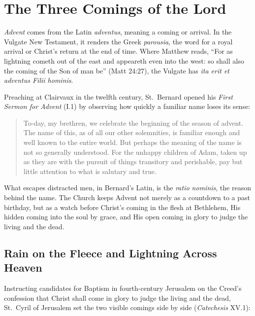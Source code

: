 \section{The Three Comings of the Lord}\label{sec:three-comings}

\textit{Advent} comes from the Latin \textit{adventus}, meaning a coming or
arrival. In the Vulgate New Testament, it renders the Greek
\textit{parousia}, the word for a royal arrival or Christ's return at the
end of time. Where Matthew reads, ``For as lightning cometh out of the east
and appeareth even into the west: so shall also the coming of the Son of
man be'' (Matt 24:27), the Vulgate has \textit{ita erit et adventus Filii
hominis}.

Preaching at Clairvaux in the twelfth century, St.~Bernard opened his
\textit{First Sermon for Advent} (I.1) by observing how quickly a familiar
name loses its sense:

\begin{quote}
To-day, my brethren, we celebrate the beginning of the season of advent.
The name of this, as of all our other solemnities, is familiar enough and
well known to the entire world. But perhaps the meaning of the name is not
so generally understood. For the unhappy children of Adam, taken up as they
are with the pursuit of things transitory and perishable, pay but little
attention to what is salutary and true.
\end{quote}

What escapes distracted men, in Bernard's Latin, is the \textit{ratio
nominis}, the reason behind the name. The Church keeps Advent not merely as
a countdown to a past birthday, but as a watch before Christ's coming in
the flesh at Bethlehem, His hidden coming into the soul by grace, and His
open coming in glory to judge the living and the dead.

\subsection{Rain on the Fleece and Lightning Across Heaven}

Instructing candidates for Baptism in fourth-century Jerusalem on the
Creed's confession that Christ shall come in glory to judge the living and
the dead, St.~Cyril of Jerusalem set the two visible comings side by side
(\textit{Catechesis} XV.1):

